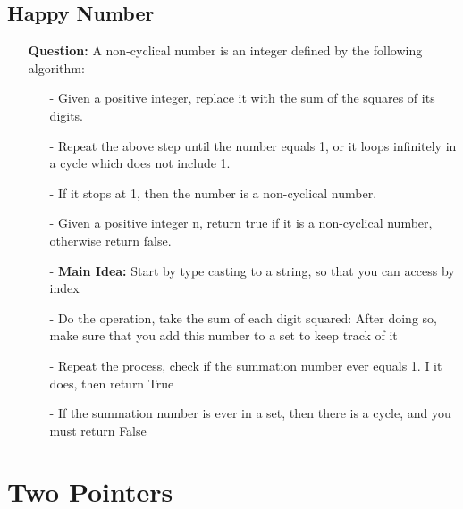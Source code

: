 \documentclass[12pt]{article}
\begin{document}
\subsection{Happy Number}
\begin{enumerate}
  \item[] \textbf{Question:} A non-cyclical number is an integer defined by the following algorithm:
    \begin{enumerate}
      \item[-] Given a positive integer, replace it with the sum of the squares of its digits.
      \item[-]  Repeat the above step until the number equals 1, or it loops infinitely in a cycle which does not include 1.
      \item[-] If it stops at 1, then the number is a non-cyclical number.
      \item[-] Given a positive integer n, return true if it is a non-cyclical number, otherwise return false.
    \end{enumerate}

    \begin{enumerate}
      \item[-] \textbf{Main Idea: } Start by type casting to a string, so that you can access by index
      \item[-] Do the operation, take the sum of each digit squared: After doing so, make sure that you add this number to a set to keep track of it
      \item[-] Repeat the process, check if the summation number ever equals 1. I it does, then return True
      \item[-] If the summation number is ever in a set, then there is a cycle, and you must return False
    \end{enumerate}
\end{enumerate}



\section{Two Pointers}
\end{document}
